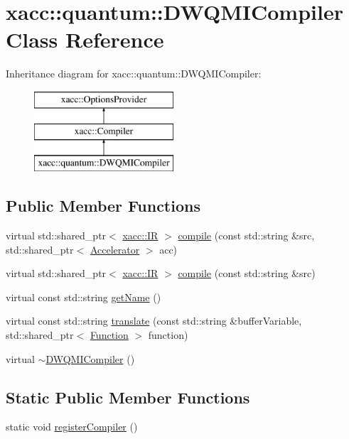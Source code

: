 \hypertarget{a00923}{}\section{xacc\+:\+:quantum\+:\+:D\+W\+Q\+M\+I\+Compiler Class Reference}
\label{a00923}
Inheritance diagram for xacc\+:\+:quantum\+:\+:D\+W\+Q\+M\+I\+Compiler\+:\begin{figure}[H]
\begin{center}
\leavevmode
\includegraphics[height=3.000000cm]{a00923}
\end{center}
\end{figure}
\subsection*{Public Member Functions}
\begin{DoxyCompactItemize}
\item 
virtual std\+::shared\+\_\+ptr$<$ \hyperlink{a01175}{xacc\+::\+IR} $>$ \hyperlink{a00923_a0df05642f1a6fd44ce7f1c0396d50c9c}{compile} (const std\+::string \&src, std\+::shared\+\_\+ptr$<$ \hyperlink{a01111}{Accelerator} $>$ acc)
\item 
virtual std\+::shared\+\_\+ptr$<$ \hyperlink{a01175}{xacc\+::\+IR} $>$ \hyperlink{a00923_aa22591343b5509bf2c3a5820130ba906}{compile} (const std\+::string \&src)
\item 
virtual const std\+::string \hyperlink{a00923_aed42de96f8e0dd94b6de183f28aee419}{get\+Name} ()
\item 
virtual const std\+::string \hyperlink{a00923_a56a345539665099329209b3b5f6810c9}{translate} (const std\+::string \&buffer\+Variable, std\+::shared\+\_\+ptr$<$ \hyperlink{a01151}{Function} $>$ function)
\item 
virtual \hyperlink{a00923_a86f9135f7dc1c3246970e2a7f6540b5c}{$\sim$\+D\+W\+Q\+M\+I\+Compiler} ()
\end{DoxyCompactItemize}
\subsection*{Static Public Member Functions}
\begin{DoxyCompactItemize}
\item 
static void \hyperlink{a00923_a421daa5286f31e2b5ab4c141a34c94cd}{register\+Compiler} ()
\end{DoxyCompactItemize}
